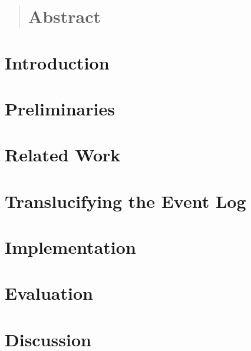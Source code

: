 \documentclass[a4paper,11pt,twoside]{pads-thesis}
\begin{document}

\gTitlePage

\begin{abstract}
\chapter*{Abstract} 

\end{abstract}

\tableofcontents

\cleardoublepage
\pagestyle{fancy}

\chapter{Introduction} \label{chap:intro}


\chapter{Preliminaries} \label{chap:prelim}


\chapter{Related Work} \label{chap:related_work}


\chapter{Translucifying the Event Log} \label{chap:method}


\chapter{Implementation} \label{chap:impl}


\chapter{Evaluation} \label{chap:eval}


\chapter{Discussion} \label{chap:discussion}

\end{document}
